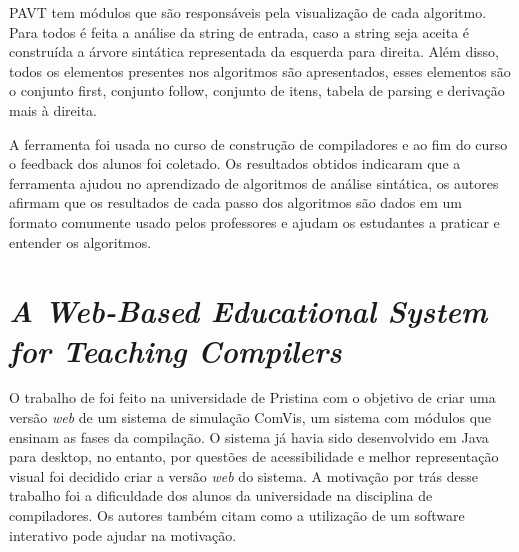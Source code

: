 PAVT tem módulos que são responsáveis pela visualização de cada algoritmo. Para todos é feita a análise da string de entrada, caso a string seja aceita é construída a árvore sintática representada da esquerda para direita. Além disso, todos os elementos presentes nos algoritmos são apresentados, esses elementos são o conjunto first, conjunto follow, conjunto de itens, tabela de parsing e derivação mais à direita.

A ferramenta foi usada no curso de construção de compiladores e ao fim do curso o feedback dos alunos foi coletado. Os resultados obtidos indicaram que a ferramenta ajudou no aprendizado de algoritmos de análise sintática, os autores afirmam que os resultados de cada passo dos algoritmos são dados em um formato comumente usado pelos professores e ajudam os estudantes a praticar e entender os algoritmos.



\section{\textit{A Web-Based Educational System for Teaching Compilers}}
O trabalho de \textcite{webbased} foi feito na universidade de Pristina com o objetivo de criar uma versão \textit{web} de um sistema de simulação ComVis, um sistema com módulos que ensinam as fases da compilação. O sistema já havia sido desenvolvido em Java para desktop, no entanto, por questões de acessibilidade e melhor representação visual foi decidido criar a versão \textit{web} do sistema. A motivação por trás desse trabalho foi a dificuldade dos alunos da universidade na disciplina de compiladores. Os autores também citam como a utilização de um software interativo pode ajudar na motivação.

